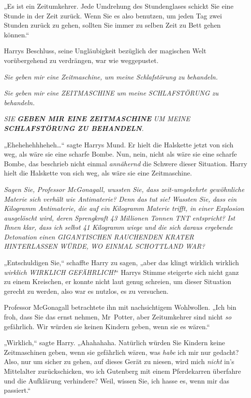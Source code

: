 {„Es ist ein Zeitumkehrer. Jede Umdrehung des Stundenglases schickt Sie eine Stunde in der Zeit zurück. Wenn Sie es also benutzen, um jeden Tag zwei Stunden zurück zu gehen, sollten Sie immer zu selben Zeit zu Bett gehen können.“

Harrys Beschluss, seine Ungläubigkeit bezüglich der magischen Welt vorübergehend zu verdrängen, war wie weggepustet.

\emph{Sie geben mir eine Zeitmaschine, um meine Schlafstörung zu behandeln.}

\emph{Sie geben mir eine ZEITMASCHINE um meine SCHLAFSTÖRUNG zu behandeln.}

\emph{SIE} \emph{\textbf{\emph{GEBEN MIR EINE ZEITMASCHINE}}} \emph{UM MEINE} \emph{\textbf{\emph{SCHLAFSTÖRUNG ZU BEHANDELN}}.}

„Ehehehehhheheh…“ sagte Harrys Mund. Er hielt die Halskette jetzt von sich weg, als wäre sie eine scharfe Bombe. Nun, nein, nicht als wäre sie eine scharfe Bombe, das beschrieb nicht einmal \emph{annähernd} die Schwere dieser Situation. Harry hielt die Halskette von sich weg, als wäre sie eine Zeitmaschine.

\emph{Sagen Sie, Professor McGonagall, wussten Sie, dass zeit-umgekehrte gewöhnliche Materie sich verhält wie Antimaterie? Denn das tut sie! Wussten Sie, dass ein Kilogramm Antimaterie, die auf ein Kilogramm Materie trifft, in einer Explosion ausgelöscht wird, deren Sprengkraft 43 Millionen Tonnen TNT entspricht? Ist Ihnen klar, dass ich selbst 41 Kilogramm wiege und die sich daraus ergebende Detonation einen GIGANTISCHEN RAUCHENDEN KRATER HINTERLASSEN WÜRDE, WO EINMAL SCHOTTLAND WAR?}

„Entschuldigen Sie,“ schaffte Harry zu sagen, „aber das klingt wirklich wirklich \emph{wirklich WIRKLICH GEFÄHRLICH!}“ Harrys Stimme steigerte sich nicht ganz zu einem Kreischen, er konnte nicht laut genug schreien, um dieser Situation gerecht zu werden, also war es nutzlos, es zu versuchen.

Professor McGonagall betrachtete ihn mit nachsichtigem Wohlwollen. „Ich bin froh, dass Sie das ernst nehmen, Mr~Potter, aber Zeitumkehrer sind nicht \emph{so} gefährlich. Wir würden sie keinen Kindern geben, wenn sie es wären.“

„Wirklich,“ sagte Harry. „Ahahahaha. Natürlich würden Sie Kindern keine Zeitmaschinen geben, wenn sie gefährlich wären, was \emph{habe} ich mir nur gedacht? Also, nur um sicher zu gehen, auf dieses Gerät zu niesen, wird mich \emph{nicht} in's Mittelalter zurückschicken, wo ich Gutenberg mit einem Pferdekarren überfahre und die Aufklärung verhindere? Weil, wissen Sie, ich hasse es, wenn mir das passiert.“

}
